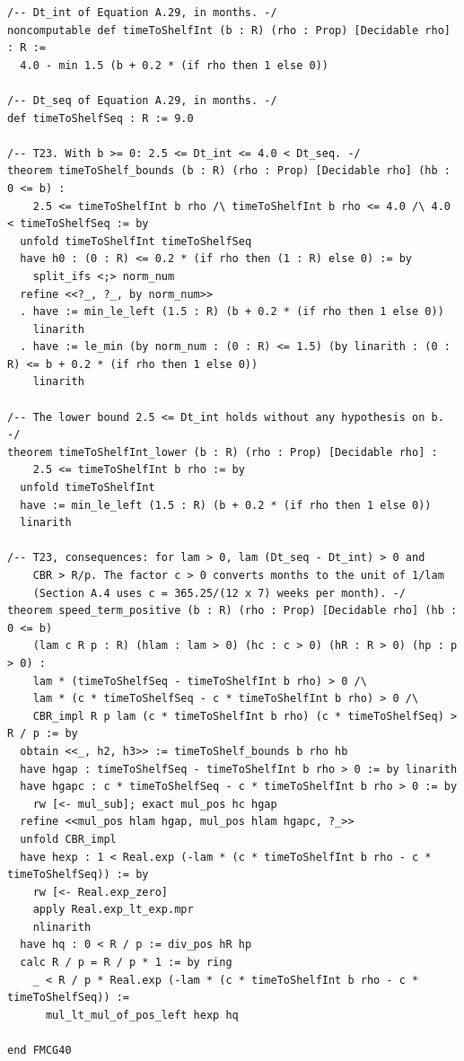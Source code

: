 \documentclass[11pt,a4paper]{article}
\begin{document}
\begin{lstlisting}
/-- Dt_int of Equation A.29, in months. -/
noncomputable def timeToShelfInt (b : R) (rho : Prop) [Decidable rho] : R :=
  4.0 - min 1.5 (b + 0.2 * (if rho then 1 else 0))

/-- Dt_seq of Equation A.29, in months. -/
def timeToShelfSeq : R := 9.0

/-- T23. With b >= 0: 2.5 <= Dt_int <= 4.0 < Dt_seq. -/
theorem timeToShelf_bounds (b : R) (rho : Prop) [Decidable rho] (hb : 0 <= b) :
    2.5 <= timeToShelfInt b rho /\ timeToShelfInt b rho <= 4.0 /\ 4.0 < timeToShelfSeq := by
  unfold timeToShelfInt timeToShelfSeq
  have h0 : (0 : R) <= 0.2 * (if rho then (1 : R) else 0) := by
    split_ifs <;> norm_num
  refine <<?_, ?_, by norm_num>>
  . have := min_le_left (1.5 : R) (b + 0.2 * (if rho then 1 else 0))
    linarith
  . have := le_min (by norm_num : (0 : R) <= 1.5) (by linarith : (0 : R) <= b + 0.2 * (if rho then 1 else 0))
    linarith

/-- The lower bound 2.5 <= Dt_int holds without any hypothesis on b. -/
theorem timeToShelfInt_lower (b : R) (rho : Prop) [Decidable rho] :
    2.5 <= timeToShelfInt b rho := by
  unfold timeToShelfInt
  have := min_le_left (1.5 : R) (b + 0.2 * (if rho then 1 else 0))
  linarith

/-- T23, consequences: for lam > 0, lam (Dt_seq - Dt_int) > 0 and
    CBR > R/p. The factor c > 0 converts months to the unit of 1/lam
    (Section A.4 uses c = 365.25/(12 x 7) weeks per month). -/
theorem speed_term_positive (b : R) (rho : Prop) [Decidable rho] (hb : 0 <= b)
    (lam c R p : R) (hlam : lam > 0) (hc : c > 0) (hR : R > 0) (hp : p > 0) :
    lam * (timeToShelfSeq - timeToShelfInt b rho) > 0 /\
    lam * (c * timeToShelfSeq - c * timeToShelfInt b rho) > 0 /\
    CBR_impl R p lam (c * timeToShelfInt b rho) (c * timeToShelfSeq) > R / p := by
  obtain <<_, h2, h3>> := timeToShelf_bounds b rho hb
  have hgap : timeToShelfSeq - timeToShelfInt b rho > 0 := by linarith
  have hgapc : c * timeToShelfSeq - c * timeToShelfInt b rho > 0 := by
    rw [<- mul_sub]; exact mul_pos hc hgap
  refine <<mul_pos hlam hgap, mul_pos hlam hgapc, ?_>>
  unfold CBR_impl
  have hexp : 1 < Real.exp (-lam * (c * timeToShelfInt b rho - c * timeToShelfSeq)) := by
    rw [<- Real.exp_zero]
    apply Real.exp_lt_exp.mpr
    nlinarith
  have hq : 0 < R / p := div_pos hR hp
  calc R / p = R / p * 1 := by ring
    _ < R / p * Real.exp (-lam * (c * timeToShelfInt b rho - c * timeToShelfSeq)) :=
      mul_lt_mul_of_pos_left hexp hq

end FMCG40
\end{lstlisting}
\end{document}
